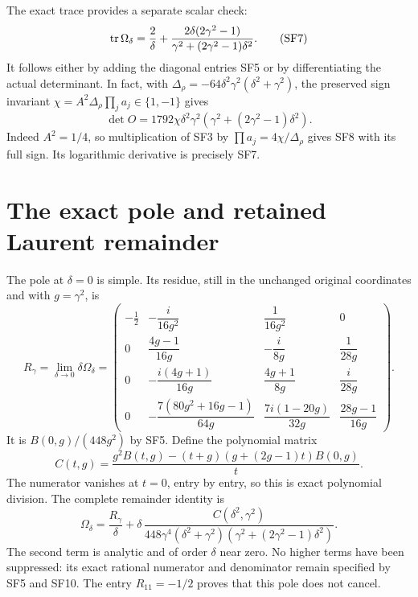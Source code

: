 The exact trace provides a separate scalar check:
\begin{equation}
 \operatorname{tr}\Omega_\delta=\frac2\delta+
        \frac{2\delta(2\gamma^2-1)}{\gamma^2+(2\gamma^2-1)\delta^2}.
 \tag{SF7}
\end{equation}
It follows either by adding the diagonal entries SF5 or by
differentiating the actual determinant. In fact, with
$\Delta_\rho=-64\delta^2\gamma^2(\delta^2+\gamma^2)$,
the preserved sign invariant
$\chi=A^2\Delta_\rho\prod_ja_j\in\{1,-1\}$ gives
\begin{equation}
 \det O=1792\chi\delta^2\gamma^2
                    (\gamma^2+(2\gamma^2-1)\delta^2).
 \tag{SF8}
\end{equation}
Indeed $A^2=1/4$, so multiplication of SF3 by
$\prod a_j=4\chi/\Delta_\rho$ gives SF8 with its full sign.
Its logarithmic derivative is precisely SF7.

\section{The exact pole and retained Laurent remainder}
The pole at $\delta=0$ is simple. Its residue, still in the
unchanged original coordinates and with $g=\gamma^2$, is
\begin{equation}
 R_\gamma=\lim_{\delta\to0}\delta\Omega_\delta
 =\begin{pmatrix}
 -\tfrac12&-\dfrac{i}{16g^2}&\dfrac1{16g^2}&0\\[5pt]
 0&\dfrac{4g-1}{16g}&-\dfrac{i}{8g}&\dfrac1{28g}\\[5pt]
 0&-\dfrac{i(4g+1)}{16g}&\dfrac{4g+1}{8g}&\dfrac{i}{28g}\\[5pt]
 0&-\dfrac{7(80g^2+16g-1)}{64g}&\dfrac{7i(1-20g)}{32g}
                                   &\dfrac{28g-1}{16g}
 \end{pmatrix}.
 \tag{SF9}
\end{equation}
It is $B(0,g)/(448g^2)$ by SF5. Define the polynomial matrix
\[
 C(t,g)=\frac{g^2B(t,g)-(t+g)(g+(2g-1)t)B(0,g)}{t}.
\]
The numerator vanishes at $t=0$, entry by entry, so this is
exact polynomial division. The complete remainder identity is
\begin{equation}
 \Omega_\delta=\frac{R_\gamma}{\delta}
       +\delta\,\frac{C(\delta^2,\gamma^2)}
        {448\gamma^4(\delta^2+\gamma^2)
                        (\gamma^2+(2\gamma^2-1)\delta^2)}.
 \tag{SF10}
\end{equation}
The second term is analytic and of order $\delta$ near zero.
No higher terms have been suppressed: its exact rational
numerator and denominator remain specified by SF5 and SF10.
The entry $R_{11}=-1/2$ proves that this pole does not cancel.

